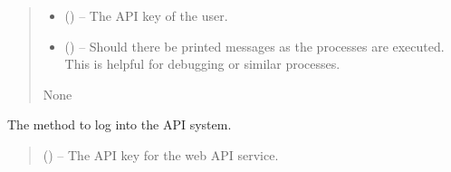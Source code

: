 \documentclass[letterpaper,11pt,english]{sphinxmanual}
\begin{document}
\begin{savenotes}
\begin{fulllineitems}
\begin{savenotes}
\begin{fulllineitems}
\begin{quote}
\begin{description}
\begin{itemize}
\item {} 
\sphinxAtStartPar
{} () – The API key of the user.

\item {} 
\sphinxAtStartPar
{} (\sphinxstyleliteralemphasis{\sphinxupquote{, }}) – Should there be printed messages as the processes are executed.
This is helpful for debugging or similar processes.

\end{itemize}

\sphinxAtStartPar
None

\end{description}\end{quote}

\end{fulllineitems}\end{savenotes}


\begin{savenotes}\begin{fulllineitems}
\label{\detokenize{code/opihiexarata.astrometry.webclient:opihiexarata.astrometry.webclient.AstrometryNetWebAPIEngine.__job_id}}
\pysigstartsignatures
{}
\pysigstopsignatures
\end{fulllineitems}\end{savenotes}


\begin{savenotes}\begin{fulllineitems}
\label{\detokenize{code/opihiexarata.astrometry.webclient:opihiexarata.astrometry.webclient.AstrometryNetWebAPIEngine.__login}}
\pysigstartsignatures
{}
\pysigstopsignatures
\sphinxAtStartPar
The method to log into the API system.
\begin{quote}\begin{description}
\sphinxAtStartPar
{} () – The API key for the web API service.


\end{description}
\end{quote}
\end{fulllineitems}
\end{savenotes}
\end{fulllineitems}
\end{savenotes}
\end{document}

